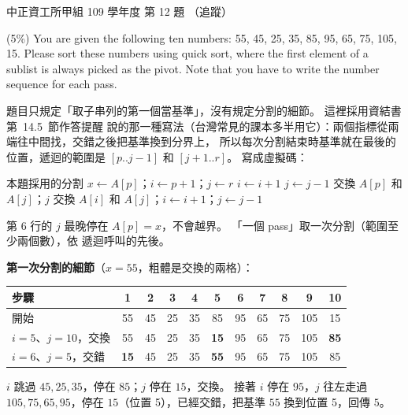 \begin{pastexam}[label={px:ccu-109-swa-07}]{中正資工所甲組 109 學年度 第 12 題}
（追蹤）

(5\%) You are given the following ten numbers: 55, 45, 25, 35, 85, 95, 65, 75, 105, 15. Please sort
these numbers using quick sort, where the first element of a sublist is always picked as the pivot.
Note that you have to write the number sequence for each pass.
\end{pastexam}

\begin{pastsoln}
題目只規定「取子串列的第一個當基準」，沒有規定分割的細節。 這裡採用資結書第~14.5~節作答提醒
說的那一種寫法（台灣常見的課本多半用它）：兩個指標從兩端往中間找，交錯之後把基準換到分界上，
所以每次分割結束時基準就在最後的位置，遞迴的範圍是 $[p..j-1]$ 和 $[j+1..r]$。 寫成虛擬碼：

\begin{pseudo}{本題採用的分割}
    \State $x \gets A[p]$；$i \gets p + 1$；$j \gets r$ 
    \While{\TRUE}
            \State $i \gets i + 1$
        \EndWhile
            \State $j \gets j - 1$
        \EndWhile
            \State 交換 $A[p]$ 和 $A[j]$；\Return $j$
        \EndIf
        \State 交換 $A[i]$ 和 $A[j]$；$i \gets i + 1$；$j \gets j - 1$
    \EndWhile
\EndFunction
\end{pseudo}

第 6 行的 $j$ 最晚停在 $A[p] = x$，不會越界。 「一個 pass」取一次分割（範圍至少兩個數），依
遞迴呼叫的先後。

\textbf{第一次分割的細節}（$x = 55$，粗體是交換的兩格）：
\begin{center}
\small
\begin{tabular}{l*{10}{c}}
\toprule
步驟 & 1 & 2 & 3 & 4 & 5 & 6 & 7 & 8 & 9 & 10 \\
\midrule
開始 & 55 & 45 & 25 & 35 & 85 & 95 & 65 & 75 & 105 & 15 \\
$i = 5$、$j = 10$，交換 & 55 & 45 & 25 & 35 & \textbf{15} & 95 & 65 & 75 & 105 & \textbf{85} \\
$i = 6$、$j = 5$，交錯 & \textbf{15} & 45 & 25 & 35 & \textbf{55} & 95 & 65 & 75 & 105 & 85 \\
\bottomrule
\end{tabular}
\end{center}
$i$ 跳過 $45, 25, 35$，停在 $85$；$j$ 停在 $15$，交換。 接著 $i$ 停在 $95$，$j$ 往左走過
$105, 75, 65, 95$，停在 $15$（位置 5），已經交錯，把基準 $55$ 換到位置 5，回傳 $5$。


\end{pastsoln}
